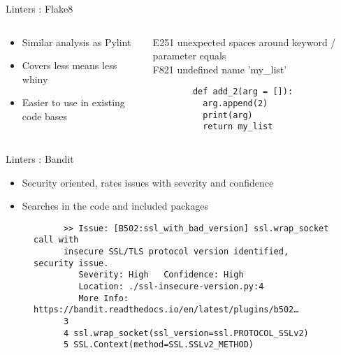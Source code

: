 \begin{frame}[fragile]{Linters : Flake8}
  \begin{columns}
    \begin{column}{0.6\linewidth}
      \begin{itemize}
        \item Similar analysis as Pylint
        \item Covers less means less whiny
        \item Easier to use in existing code bases
      \end{itemize}
    \end{column}
    \begin{column}{0.4\linewidth}
      {\ttfamily\tiny
        E251 unexpected spaces around keyword / parameter equals\\
        F821 undefined name 'my\_list'
      }

      \begin{verbatim}
        def add_2(arg = []):
          arg.append(2)
          print(arg)
          return my_list
      \end{verbatim}
    \end{column}
  \end{columns}
\end{frame}

\begin{frame}[fragile]{Linters : Bandit}
  \begin{itemize}
    \item Security oriented, rates issues with severity and confidence
    \item Searches in the code and included packages
  \end{itemize}

  \begin{figure}
    \begin{verbatim}
      >> Issue: [B502:ssl_with_bad_version] ssl.wrap_socket call with
      insecure SSL/TLS protocol version identified, security issue.
         Severity: High   Confidence: High
         Location: ./ssl-insecure-version.py:4
         More Info: https://bandit.readthedocs.io/en/latest/plugins/b502…
      3
      4	ssl.wrap_socket(ssl_version=ssl.PROTOCOL_SSLv2)
      5	SSL.Context(method=SSL.SSLv2_METHOD)
    \end{verbatim}
  \end{figure}
\end{frame}

